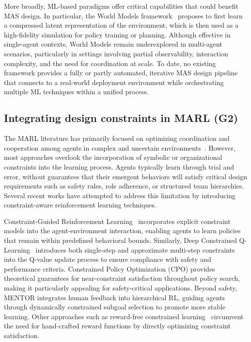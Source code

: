 \documentclass[pdflatex,sn-mathphys-num]{sn-jnl}%
\theoremstyle{thmstyleone}%
\theoremstyle{thmstyletwo}%
\theoremstyle{thmstylethree}%
\begin{document}
More broadly, ML-based paradigms offer critical capabilities that could benefit MAS design. In particular, the World Models framework~\cite{Ha2018} proposes to first learn a compressed latent representation of the environment, which is then used as a high-fidelity simulation for policy training or planning. Although effective in single-agent contexts, World Models remain underexplored in multi-agent scenarios, particularly in settings involving partial observability, interaction complexity, and the need for coordination at scale.
%
To date, no existing framework provides a fully or partly automated, iterative MAS design pipeline that connects to a real-world deployment environment while orchestrating multiple ML techniques within a unified process.

\subsection{Integrating design constraints in MARL (G2)}

The MARL literature has primarily focused on optimizing coordination and cooperation among agents in complex and uncertain environments~\cite{Zhang2021, Papoudakis2021}. However, most approaches overlook the incorporation of symbolic or organizational constraints into the learning process. Agents typically learn through trial and error, without guarantees that their emergent behaviors will satisfy critical design requirements such as safety rules, role adherence, or structured team hierarchies. Several recent works have attempted to address this limitation by introducing constraint-aware reinforcement learning techniques.

Constraint-Guided Reinforcement Learning~\cite{spieker2021constraint} incorporates explicit constraint models into the agent-environment interaction, enabling agents to learn policies that remain within predefined behavioral bounds. Similarly, Deep Constrained Q-Learning~\cite{kalweit2020deep} introduces both single-step and approximate multi-step constraints into the Q-value update process to ensure compliance with safety and performance criteria. Constrained Policy Optimization (CPO)\cite{achiam2017constrained} provides theoretical guarantees for near-constraint satisfaction throughout policy search, making it particularly appealing for safety-critical applications. Beyond safety, MENTOR\cite{zhou2025mentor} integrates human feedback into hierarchical RL, guiding agents through dynamically constrained subgoal selection to promote more stable learning. Other approaches such as reward-free constrained learning~\cite{miryoosefi2022} circumvent the need for hand-crafted reward functions by directly optimizing constraint satisfaction.
\end{document}
